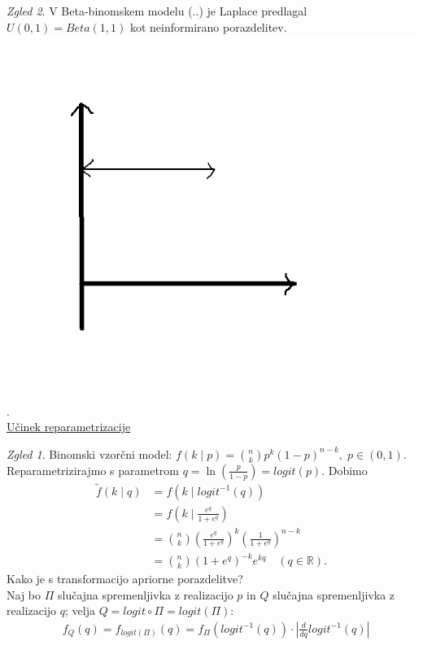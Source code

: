 \documentclass[a4paper, 12pt]{book}
\theoremstyle{definition}
\theoremstyle{remark}
\newtheorem*{exmp}{Zgled}
\newcommand{\R}{\mathbb{R}}
\begin{document}
\begin{exmp}
  V Beta-binomskem modelu (..) je Laplace predlagal $U(0,1) = Beta(1,1)$ kot neinformirano porazdelitev. \\
  \includegraphics[scale=0.3]{ploščata_2_6} \\
  . \\
  \underline{Učinek reparametrizacije}
  \begin{exmp}
    Binomski vzorčni model: $f(k \mid p) = \binom{n}{k} p^k (1-p)^{n-k}, \; p \in (0,1)$. \\
    Reparametrizirajmo s parametrom $q = \ln\left(\frac{p}{1-p}\right) = logit(p)$.
    Dobimo
    \begin{align*}
      \widetilde{f}(k \mid q) &= f(k \mid logit^{-1}(q)) \\
      &= f\left(k \mid \frac{e^q}{1+e^q}\right) \\
      &= \binom{n}{k} \left(\frac{e^q}{1+e^q}\right)^k \left(\frac{1}{1+e^q}\right)^{n-k} \\
      &= \binom{n}{k} (1+e^q)^{-k} e^{kq} \quad (q \in \R).
    \end{align*}
    Kako je s transformacijo apriorne porazdelitve? \\
    Naj bo $\Pi$ slučajna spremenljivka z realizacijo $p$ in $Q$ slučajna spremenljivka z realizacijo $q$;
    velja $Q = logit \circ \Pi = logit(\Pi)$:
    \begin{align*}
      &f_Q(q) = f_{logit(\Pi)}(q) = f_{\Pi}(logit^{-1}(q)) \cdot \left|\frac{d}{dq} logit^{-1}(q)\right| \\

\end{align*}
\end{exmp}
\end{exmp}
\end{document}
